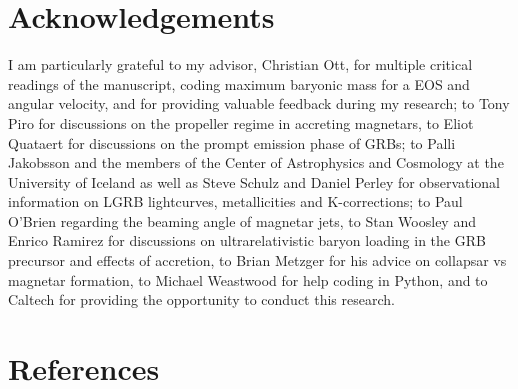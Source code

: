 \documentclass{article}
\begin{document}
\section{Acknowledgements}
I am particularly grateful to my advisor, Christian Ott, for multiple critical readings of the manuscript, coding maximum baryonic mass for a EOS and angular velocity, and for providing valuable feedback during my research; to Tony Piro for discussions on the propeller regime in accreting magnetars, to Eliot Quataert for discussions on the prompt emission phase of GRBs; to Palli Jakobsson and the members of the Center of Astrophysics and Cosmology at the University of Iceland as well as Steve Schulz and Daniel Perley for observational information on LGRB lightcurves,  metallicities and K-corrections; to Paul O'Brien regarding the beaming angle of magnetar jets, to Stan Woosley and Enrico Ramirez for discussions on ultrarelativistic baryon loading in the GRB precursor and effects of accretion, to Brian Metzger for his advice on collapsar vs magnetar formation, to Michael Weastwood for help coding in Python, and to Caltech for providing the opportunity to conduct this research.
\newpage
\clearpage
\renewcommand*{\refname}{}
\section{References}


\end{document}
